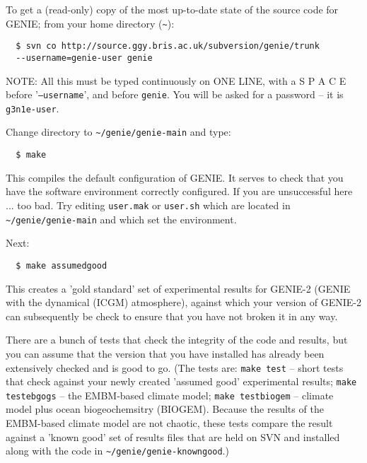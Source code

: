 \documentclass[10pt,twoside]{article}
\begin{document}
\begin{compactenum}
	
	\item	To get a (read-only) copy of the most up-to-date state of the source code for GENIE; from your home directory (\texttt{\~{}}):
  \vspace{-5.5pt}\begin{verbatim}
  $ svn co http://source.ggy.bris.ac.uk/subversion/genie/trunk
  --username=genie-user genie
  \end{verbatim}\vspace{-16.5pt}
  NOTE: All this must be typed continuously on ONE LINE, with a S P A C E before '\texttt{--username}', and before \texttt{genie}.
	You will be asked for a password -- it is \texttt{g3n1e-user}.
		
	\item	Change directory to \texttt{\~{}/genie/genie-main} and type:
  \vspace{-5.5pt}\begin{verbatim}
  $ make
  \end{verbatim}\vspace{-16.5pt}
  This compiles the default configuration of GENIE. It serves to check that you have the software environment correctly configured. If you are unsuccessful here ... too bad. Try editing \texttt{user.mak} or \texttt{user.sh} which are located in \texttt{\~{}/genie/genie-main} and which set the environment.

	\item	Next:
  \vspace{-5.5pt}\begin{verbatim}
  $ make assumedgood
  \end{verbatim}\vspace{-16.5pt}
  This creates a 'gold standard' set of experimental results for GENIE-2 (GENIE with the dynamical (ICGM) atmosphere), against which your version of GENIE-2 can subsequently be check to ensure that you have not broken it in any way.
  
	\item	There are a bunch of tests that check the integrity of the code and results, but you can assume that the version that you have installed has already been extensively checked and is good to go. (The tests are: \texttt{make test} -- short tests that check against your newly created 'assumed good' experimental results; \texttt{make testebgogs} -- the EMBM-based climate model; \texttt{make testbiogem} -- climate  model plus ocean biogeochemsitry (BIOGEM). Because the results of the EMBM-based climate model are not chaotic, these tests compare the result against a 'known good' set of results files that are held on SVN and installed along with the code in \texttt{\~{}/genie/genie-knowngood}.)
  

\end{compactenum}
\end{document}
